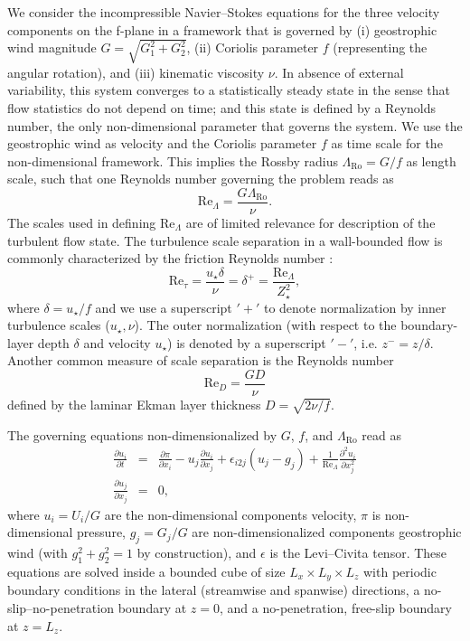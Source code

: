 \documentclass[smallcondensed,final]{svjour3}
\newcommand{\p}{\partial}
\newcommand{\RO}{\mathrm{Ro}}
\newcommand{\RE}{\mathrm{Re}}
\newcommand{\LR}{\Lambda_\RO}
\begin{document}
%
\par
%
We consider the incompressible Navier--Stokes equations for the three velocity components on the f-plane in a framework
that is governed by %
(i)   geostrophic wind magnitude $G=\sqrt{G_1^2+G_2^2}$,
(ii)  Coriolis parameter $f$ (representing the angular rotation), and
(iii) kinematic viscosity $\nu$.
%
In absence of external variability, this system converges to a statistically steady state in the sense that flow
statistics do not depend on time; and this state is defined by a Reynolds number,
the only non-dimensional parameter that governs the system.
%
We use the geostrophic wind as velocity and the Coriolis parameter $f$ as time scale for the non-dimensional
framework.
%
This implies the Rossby radius $\LR=G/f$ as length scale, such that one Reynolds number
governing the problem reads as
%
\begin{equation}
  \RE_\Lambda=\frac{G \LR }{\nu}. 
\end{equation}
%
The scales used in defining $\RE_\Lambda$ are of limited relevance for description of the turbulent flow state.
%
The turbulence scale separation in a wall-bounded flow is commonly characterized by the friction Reynolds number
\citep{jimenez:ARF2012}:
\begin{equation}
  \RE_\tau = \frac{u_\star\delta}{\nu} = \delta^+ = \frac{\RE_\Lambda}{Z_\star^2}, 
\end{equation}
where $\delta=u_\star/f$ and we use a superscript $'+'$ to denote normalization by inner turbulence
scales ($u_\star, \nu$). 
%
The outer normalization (with respect to the boundary-layer depth $\delta$ and velocity $u_\star$) is denoted 
by a superscript $'-'$, i.e. $z^-=z/\delta$.  
%
Another common measure of scale separation is the Reynolds number 
\begin{equation}
  \RE_D = \frac{G D}{\nu} 
\end{equation}  defined by the laminar Ekman layer thickness $D=\sqrt{2\nu/f}$.
%
\par
%
The governing equations  non-dimensionalized by $G$, $f$, and $\Lambda_\mathrm{\RO}$ read as 
\begin{subequations} 
\label{eqn:governing} 
\begin{eqnarray}
  \frac{\partial u_i}{\partial t} &=& \frac{\p \pi}{\p x_i} - u_j \frac{\p u_i}{\p x_j} + \epsilon_{i2j} (u_j -g_j)   + \frac{1}{\RE_\Lambda} \frac{\p^2 u_i}{\p x_{j}^2} \\ 
  \frac{\partial u_j}{\partial x_j} &=& 0,   
\end{eqnarray} 
\end{subequations}
where $u_i=U_i/G$ are the non-dimensional components velocity, $\pi$ is non-dimen\-sio\-nal pressure, $g_j=G_j/G$ are non-dimensionalized components geostrophic wind (with $g_{1}^2+g_{2}^2=1$ by construction), and $\epsilon$ is the Levi--Civita tensor.
%
These equations are solved inside a bounded cube of size $L_x \times L_y \times L_z$ with periodic boundary conditions in the lateral (streamwise and spanwise) directions, a no-slip--no-penetration boundary at $z=0$, and
a no-penetration, free-slip boundary at $z=L_z$.
%
\end{document}
